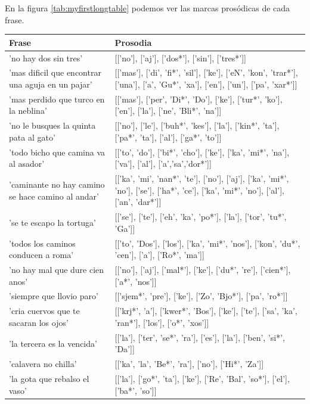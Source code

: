 \documentclass[11pt,a4paper,twoside]{tesis}
\begin{document}
En la figura \ref{tab:myfirstlongtable} podemos ver las marcas prosódicas de cada frase.

\centering
\begin{longtable}{| p{} | p{} |} 
\hline
\textbf{Frase}  & \textbf{Prosodia}  \\ \hline

'no hay dos sin tres' & [['no'], ['aj'], ['dos*'], ['sin'], ['tres*']] \\ \hline
'mas dificil que encontrar una aguja en un pajar' & [['mas'], ['di', 'fi*', 'sil'], ['ke'], ['eN', 'kon', 'trar*'], ['una'], ['a', 'Gu*', 'xa'], ['en'], ['un'], ['pa', 'xar*']] \\ \hline
'mas perdido que turco en la neblina' & [['mas'], ['per', 'Di*', 'Do'], ['ke'], ['tur*', 'ko'], ['en'], ['la'], ['ne', 'Bli*', 'na']] \\ \hline
'no le busques la quinta pata al gato' & [['no'], ['le'], ['buh*', 'kes'], ['la'], ['kin*', 'ta'], ['pa*', 'ta'], ['al'], ['ga*', 'to']] \\ \hline
'todo bicho que camina va al asador' & [['to', 'do'], ['bi*', 'cho'], ['ke'], ['ka', 'mi*', 'na'], ['va'], ['al'], ['a','sa','dor*']] \\ \hline
'caminante no hay camino se hace camino al andar' & [['ka', 'mi', 'nan*', 'te'], ['no'], ['aj'], ['ka', 'mi*', 'no'], ['se'], ['ha*', 'ce'], ['ka', 'mi*', 'no'], ['al'], ['an', 'dar*']] \\ \hline
'se te escapo la tortuga' & [['se'], ['te'], ['eh', 'ka', 'po*'], ['la'], ['tor', 'tu*', 'Ga']] \\ \hline
'todos los caminos conducen a roma' & [['to', 'Dos'], ['los'], ['ka', 'mi*', 'nos'], ['kon', 'du*', 'cen'], ['a'], ['Ro*', 'ma']] \\ \hline
'no hay mal que dure cien anos' & [['no'], ['aj'], ['mal*'], ['ke'], ['du*', 're'], ['cien*'], ['a*', 'nos']] \\ \hline
'siempre que llovio paro' & [['sjem*', 'pre'], ['ke'], ['Zo', 'Bjo*'], ['pa', 'ro*']] \\ \hline
'cria cuervos que te sacaran los ojos' & [['krj*', 'a'], ['kwer*', 'Bos'], ['ke'], ['te'], ['sa', 'ka', 'ran*'], ['los'], ['o*', 'xos']] \\ \hline
'la tercera es la vencida' & [['la'], ['ter', 'se*', 'ra'], ['es'], ['la'], ['ben', 'si*', 'Da']] \\ \hline
'calavera no chilla' & [['ka', 'la', 'Be*', 'ra'], ['no'], ['Hi*', 'Za']] \\ \hline
'la gota que rebalso el vaso' & [['la'], ['go*', 'ta'], ['ke'], ['Re', 'Bal', 'so*'], ['el'], ['ba*', 'so']] \\ \hline

\end{longtable}
\end{document}
